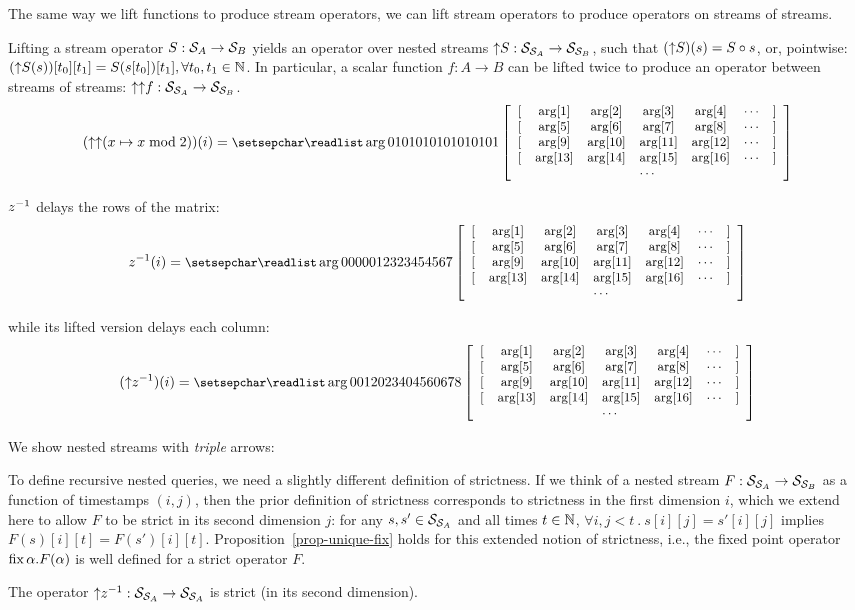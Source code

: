 The same way we lift functions to produce stream operators, we can
lift stream operators to produce operators on streams of streams.

Lifting a stream operator $S: \mathcal{S}_{A} \to \mathcal{S}_{B}$ yields an operator over
nested streams ${\uparrow}S: \mathcal{S}_{\mathcal{S}_{A}} \to \mathcal{S}_{\mathcal{S}_{B}}$, such
that $({\uparrow}S)(s) = S \circ s$, or, pointwise: $({\uparrow}S(s))[t_0][t_1] =
S(s[t_0])[t_1], \forall t_0, t_1 \in \mathbb{N}$.  In particular, a scalar function $f:
A \rightarrow B$ can be lifted twice to produce an operator between streams of
streams: ${\uparrow}{\uparrow}f: \mathcal{S}_{\mathcal{S}_{A}} \rightarrow \mathcal{S}_{\mathcal{S}_{B}}$.
$$(\lift{\lift{(x \mapsto x \bmod 2)}})(i) =
  \ssa{0 1 0 1 0 1 0 1 0 1 0 1 0 1 0 1}$$

$z^{-1}$ delays the rows of the matrix:
$$\zm(i) = \ssa{0 0 0 0 0 1 2 3 2 3 4 5 4 5 6 7}$$

\noindent while its lifted version delays each column:
$$(\lift{\zm})(i) = \ssa{0 0 1 2 0 2 3 4 0 4 5 6 0 6 7 8}$$

We show nested streams with \emph{triple} arrows:

\begin{center}
\end{center}

To define recursive nested queries, we need a slightly different
definition of strictness.  If we think of a nested stream $F:
\mathcal{S}_{\mathcal{S}_{A}} \to \mathcal{S}_{\mathcal{S}_{B}}$ as a function of
timestamps $(i, j)$, then the prior definition of strictness
corresponds to strictness in the first dimension $i$, which we extend
here to allow $F$ to be strict in its second dimension $j$: for any
$s, s' \in \mathcal{S}_{\mathcal{S}_{A}}$ and all times $t \in \mathbb{N}$, $\forall i,
j < t~.~s[i][j] = s'[i][j]$ implies $F(s)[i][t] = F(s')[i][t]$.
Proposition~\ref{prop-unique-fix} holds for this extended notion of
strictness, i.e., the fixed point operator $\mbox{fix}\,\alpha.F(\alpha)$
is well defined for a strict operator $F$.

\begin{proposition}\label{prop-liftz}
The operator ${\uparrow}z^{-1}: \mathcal{S}_{\mathcal{S}_{A}} \to \mathcal{S}_{\mathcal{S}_{A}}$ is strict (in its second dimension).
\end{proposition}

